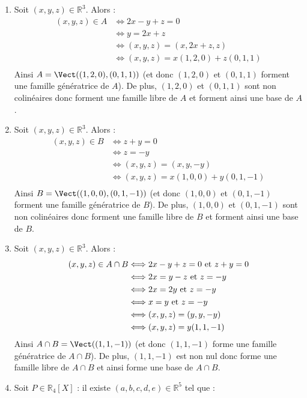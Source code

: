 \documentclass[a4paper,twoside,french,11pt]{VcCours}
\begin{document}
\begin{enumerate}
\item Soit $(x,y,z) \in \mathbb{R}^3$. Alors :
\begin{align*}
(x,y,z) \in A & \Longleftrightarrow 2x-y+z=0 \\
& \Longleftrightarrow y=2x+z \\
& \Longleftrightarrow (x,y,z) = (x,2x+z,z) \\
& \Longleftrightarrow (x,y,z) = x(1,2,0) + z(0,1,1) \\
\end{align*}
Ainsi $A = \Vect((1,2,0),(0,1,1))$ (et donc $(1,2,0)$ et $(0,1,1)$ forment une famille génératrice de $A$). De plus, $(1,2,0)$ et $(0,1,1)$ sont non colinéaires donc forment une famille libre de $A$ et forment ainsi une base de $A$.
\item Soit $(x,y,z) \in \mathbb{R}^3$. Alors :
\begin{align*}
(x,y,z) \in B & \Longleftrightarrow z+y=0 \\
& \Longleftrightarrow z=-y\\
& \Longleftrightarrow (x,y,z) = (x,y,-y) \\
& \Longleftrightarrow (x,y,z) = x(1,0,0) + y (0,1,-1) \\
\end{align*}
Ainsi $B = \Vect((1,0,0),(0,1,-1))$ (et donc $(1,0,0)$ et $(0,1,-1)$ forment une famille génératrice de $B$). De plus, $(1,0,0)$ et $(0,1,-1)$ sont non colinéaires donc forment une famille libre de $B$ et forment ainsi une base de $B$.
\item Soit $(x,y,z) \in \mathbb{R}^3$. Alors :
\begin{align*}
(x,y,z) \in A \cap B & \Longleftrightarrow 2x-y+z=0 \hbox{ et } z+y= 0 \\
& \Longleftrightarrow 2x=y-z  \hbox{ et } z=-y \\
& \Longleftrightarrow 2x=2y \hbox{ et } z=-y \\
& \Longleftrightarrow x=y  \hbox{ et } z=-y \\
& \Longleftrightarrow (x,y,z)=(y,y,-y) \\
& \Longleftrightarrow (x,y,z)=y(1,1,-1) \\
\end{align*}
Ainsi $A \cap B = \Vect((1,1,-1))$ (et donc $(1,1,-1)$ forme une famille génératrice de $A \cap B$). De plus, $(1,1,-1)$ est non nul donc forme une famille libre de $A \cap B$ et ainsi forme une base de $A \cap B$.
\item Soit $P \in \mathbb{R}_4[X]$ : il existe $(a,b,c,d,e) \in \mathbb{R}^5$ tel que :

\end{enumerate}
\end{document}
